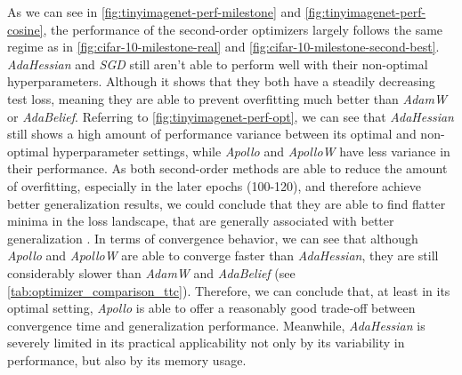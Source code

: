 As we can see in \ref{fig:tinyimagenet-perf-milestone} and \ref{fig:tinyimagenet-perf-cosine}, the performance of the second-order optimizers 
largely follows the same regime as in \ref{fig:cifar-10-milestone-real} and \ref{fig:cifar-10-milestone-second-best}. \emph{AdaHessian} and \emph{SGD} still aren't able to perform 
well with their non-optimal hyperparameters. Although it shows that they both have a steadily decreasing test loss, 
meaning they are able to prevent overfitting much better than \emph{AdamW} or \emph{AdaBelief}. 
Referring to \ref{fig:tinyimagenet-perf-opt}, we can see that \emph{AdaHessian} still shows a high amount of performance variance 
between its optimal and non-optimal hyperparameter settings, while \emph{Apollo} and \emph{ApolloW} have less variance in their performance. 
As both second-order methods are able to reduce the amount of overfitting, especially in the later epochs (100-120), and therefore 
achieve better generalization results, we could conclude that they are able to find flatter minima in the loss landscape, that
are generally associated with better generalization \cite{Goodfellow-et-al-2016}.
In terms of convergence behavior, we can see that although \emph{Apollo} and \emph{ApolloW} are able
to converge faster than \emph{AdaHessian}, they are still considerably slower than \emph{AdamW} and \emph{AdaBelief} (see \ref{tab:optimizer_comparison_ttc}). 
Therefore, we can conclude that, at least in its optimal setting, \emph{Apollo} is able to offer a reasonably good 
trade-off between convergence time and generalization performance. Meanwhile, \emph{AdaHessian} is severely limited in its practical 
applicability not only by its variability in performance, but also by its memory usage.

